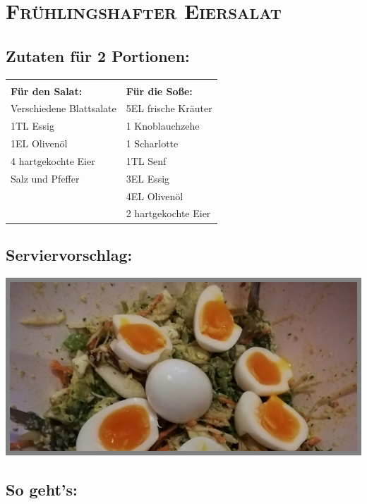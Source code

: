 \section{\textsc{Frühlingshafter Eiersalat}}

\subsection*{Zutaten für 2 Portionen:}

\begin{tabular}{p{7.5cm} p{7.5cm}}
	& \\
	\textbf{Für den Salat:} & \textbf{Für die Soße:} \\
	Verschiedene Blattsalate & 5EL frische Kräuter \\
	1TL Essig & 1 Knoblauchzehe \\
	1EL Olivenöl & 1 Scharlotte \\
	4 hartgekochte Eier & 1TL Senf \\
	Salz und Pfeffer & 3EL Essig \\
	& 4EL Olivenöl \\
  & 2 hartgekochte Eier
\end{tabular}

\subsection*{Serviervorschlag:}

\includegraphics[width=\textwidth]{img/eiersalat.jpeg} \cite{fruehlingeiersalat}

\subsection*{So geht's:}

